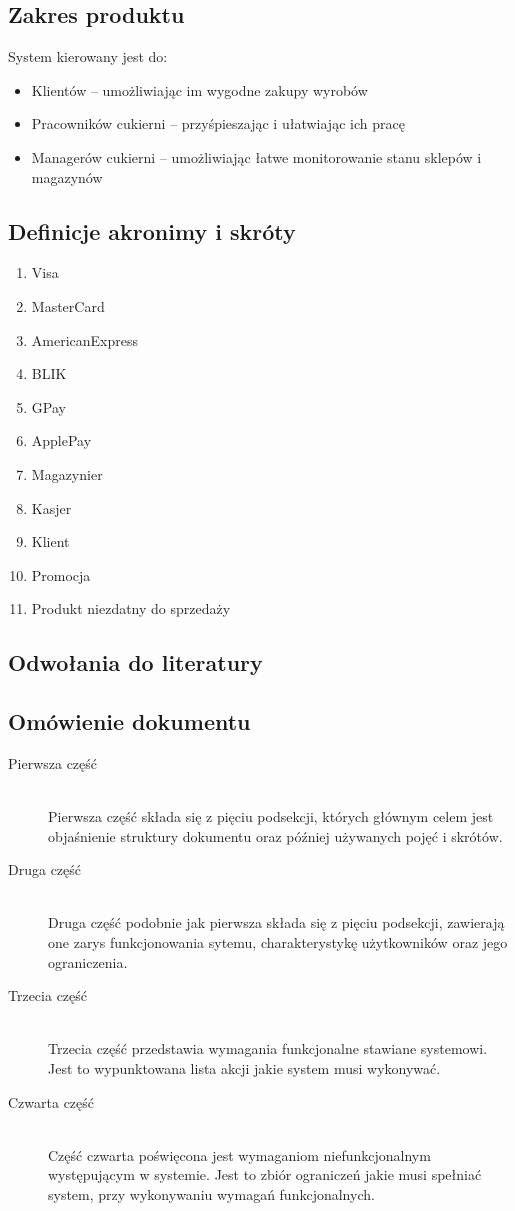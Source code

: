 \documentclass{article}
\begin{document}
\subsection{Zakres produktu}
System kierowany jest do:
\begin{itemize}
    \item Klientów -- umożliwiając im wygodne zakupy wyrobów
    \item Pracowników cukierni -- przyśpieszając i ułatwiając ich pracę
    \item Managerów cukierni --  umożliwiając łatwe monitorowanie stanu sklepów i magazynów 
\end{itemize}
\subsection{Definicje akronimy i skróty}
\begin{enumerate}
    \item Visa
    \item MasterCard
    \item AmericanExpress
    \item BLIK
    \item GPay
    \item ApplePay
    \item Magazynier
    \item Kasjer
    \item Klient
    \item Promocja
    \item Produkt niezdatny do sprzedaży
\end{enumerate}
\subsection{Odwołania do literatury}
\subsection{Omówienie dokumentu}
\begin{description}
    \item [Pierwsza część] \hfill \\
            Pierwsza część składa się z pięciu podsekcji, których głównym celem jest objaśnienie struktury dokumentu oraz później używanych pojęć i skrótów.
    \item [Druga część] \hfill \\
            Druga część podobnie jak pierwsza składa się z pięciu podsekcji, zawierają one zarys funkcjonowania sytemu, charakterystykę użytkowników oraz jego ograniczenia.
    \item [Trzecia część] \hfill \\
            Trzecia część przedstawia wymagania funkcjonalne stawiane systemowi. Jest to wypunktowana lista akcji jakie system musi wykonywać.
    \item [Czwarta część] \hfill \\
            Część czwarta poświęcona jest wymaganiom niefunkcjonalnym występującym w systemie. Jest to zbiór ograniczeń jakie musi spełniać system, przy wykonywaniu wymagań funkcjonalnych.
    \end{description}
\end{document}
